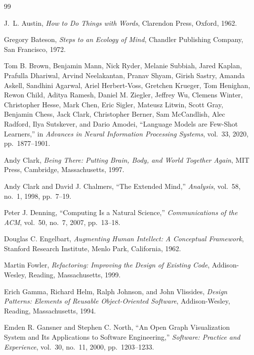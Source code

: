 \documentclass[11pt]{article}
\begin{document}
\newpage

\begin{thebibliography}{99}

J.~L. Austin,
\textit{How to Do Things with Words},
Clarendon Press,
Oxford,
1962.

Gregory Bateson,
\textit{Steps to an Ecology of Mind},
Chandler Publishing Company,
San Francisco,
1972.

Tom B. Brown, Benjamin Mann, Nick Ryder, Melanie Subbiah,
Jared Kaplan, Prafulla Dhariwal, Arvind Neelakantan,
Pranav Shyam, Girish Sastry, Amanda Askell, Sandhini Agarwal,
Ariel Herbert-Voss, Gretchen Krueger, Tom Henighan,
Rewon Child, Aditya Ramesh, Daniel M. Ziegler,
Jeffrey Wu, Clemens Winter, Christopher Hesse,
Mark Chen, Eric Sigler, Mateusz Litwin, Scott Gray,
Benjamin Chess, Jack Clark, Christopher Berner,
Sam McCandlish, Alec Radford, Ilya Sutskever, and Dario Amodei,
``Language Models are Few-Shot Learners,''
in \textit{Advances in Neural Information Processing Systems},
vol.~33,
2020,
pp.~1877--1901.

Andy Clark,
\textit{Being There: Putting Brain, Body, and World Together Again},
MIT Press,
Cambridge, Massachusetts,
1997.

Andy Clark and David J. Chalmers,
``The Extended Mind,''
\textit{Analysis},
vol.~58,
no.~1,
1998,
pp.~7--19.

Peter J. Denning,
``Computing Is a Natural Science,''
\textit{Communications of the ACM},
vol.~50,
no.~7,
2007,
pp.~13--18.

Douglas C. Engelbart,
\textit{Augmenting Human Intellect: A Conceptual Framework},
Stanford Research Institute,
Menlo Park, California,
1962.

Martin Fowler,
\textit{Refactoring: Improving the Design of Existing Code},
Addison-Wesley,
Reading, Massachusetts,
1999.

Erich Gamma, Richard Helm, Ralph Johnson, and John Vlissides,
\textit{Design Patterns: Elements of Reusable Object-Oriented Software},
Addison-Wesley,
Reading, Massachusetts,
1994.

Emden R. Gansner and Stephen C. North,
``An Open Graph Visualization System and Its Applications to Software Engineering,''
\textit{Software: Practice and Experience},
vol.~30,
no.~11,
2000,
pp.~1203--1233.


\end{thebibliography}
\end{document}
